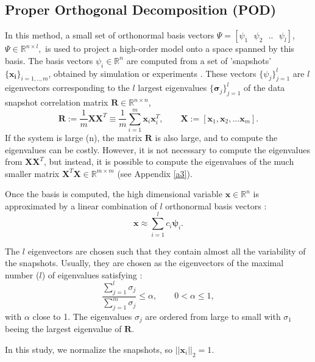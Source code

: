 \documentclass[12pt]{article}
\begin{document}
\subsection*{Proper Orthogonal Decomposition (POD)}\label{POD}
\hspace{0.5cm}In this method, a small set of orthonormal basis vectors $\Psi=[\psi_1 \text{ }\psi_2 \text{ }.. \text{ }\psi_l]$, $\Psi \in \mathbb{R}^{n\times l}, $ is used to project a high-order model onto a space spanned by this basis.
The basis vectors $\psi_i\in \mathbb{R}^n$ are computed from a set of 'snapshots' $\{ \mathbf{x_i}\} _{i=1,..,m}$, 
obtained by simulation or experiments \cite{Mark06}. These vectors $\{ \psi _j \} ^l _{j=1}$ are $l$ eigenvectors corresponding to 
the $l$ largest eigenvalues $\{ \mathbf{\sigma} _j \} ^l _{j=1}$ of the data snapshot correlation matrix $\mathbf{R}\in \mathbb{R}^{n \times n}$,
\begin{equation}\label{eq:POD}
\mathbf{R}:= \frac{1}{m}\mathbf{X}\mathbf{X}^T \equiv \frac{1}{m} \sum_{i=1}^m \mathbf{x}_i \mathbf{x}_i^T,
\qquad \mathbf{X}:=[\mathbf{x}_1,\mathbf{x}_2,...\mathbf{x}_m].
\end{equation}
If the system is large (n), the matrix $\mathbf{R}$ is also large, and to compute the eigenvalues can be costly. However, it is not necessary to compute the eigenvalues from $\mathbf{X}\mathbf{X}^T$, but instead, it is possible to compute the eigenvalues of the much smaller matrix $\mathbf{X}^T\mathbf{X}\in \mathbb{R}^{m \times m}$ (see Appendix \ref{a3}).\par
Once the basis is computed, the high dimensional variable $\mathbf{x} \in \mathbb{R}^n$
is approximated by a linear combination of $l$ orthonormal basis vectors \cite{Astrid11}:
\begin{equation}\label{eq4}
  \mathbf{x}\approx \sum_{i=1}^lc_i \mathbf{\psi}_i.
\end{equation}

The $l$ eigenvectors are chosen such that they contain almost all the variability of the snapshots. 
Usually, they are chosen as the eigenvectors of the maximal number ($l$) of eigenvalues satisfying \cite{Mark06}:
\begin{equation}
\frac{\sum_{j=1}^l\sigma_j}{\sum_{j=1}^m\sigma_j}\leq \alpha, \qquad 0<\alpha \leq 1,
\end{equation}
with $\alpha$ close to 1. The eigenvalues $\sigma_j$ are ordered from large to small with $\sigma_1$ beeing
the largest eigenvalue of $\mathbf{R}$. 
 \par
In this study, we normalize the snapshots, so $||\mathbf{x}_i||_2=1.$
\end{document}
